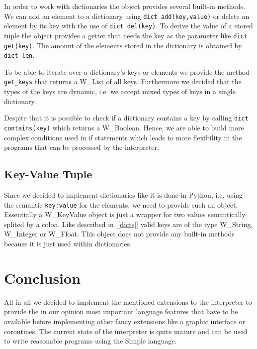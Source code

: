 \documentclass{article}
\begin{document}
In order to work with dictionaries the object provides several built-in methods.
We can add an element to a dictionary using \texttt{dict add(key,value)} or delete an element by its key with the use of \texttt{dict del(key)}.
To derive the value of a stored tuple the object provides a getter that needs the key as the parameter like \texttt{dict get(key)}.
The amount of the elements stored in the dictionary is obtained by \texttt{dict len}.

To be able to iterate over a dictionary's keys or elements we provide the method \texttt{get\_keys} that returns a W\_List of all keys.
Furthermore we decided that the types of the keys are dynamic, i.e. we accept mixed types of keys in a single dictionary.

Despite that it is possible to check if a dictionary contains a key by calling \texttt{dict contains(key)} which returns a W\_Boolean.
Hence, we are able to build more complex conditions used in if statements which leads to more flexibility in the programs that can be processed by the interpreter.

\subsection{Key-Value Tuple}
Since we decided to implement dictionaries like it is done in Python, i.e. using the semantic \texttt{key:value} for the elements, we need to provide such an object.
Essentially a W\_KeyValue object is just a wrapper for two values semantically splited by a colon.
Like described in [\ref{dicts}] valid keys are of the type W\_String, W\_Integer or W\_Float.
This object does not provide any built-in methods because it is just used within dictionaries.

\section{Conclusion}
All in all we decided to implement the mentioned extensions to the interpreter to provide the in our opinion most important language features that have to be available before implementing other fancy extensions like a graphic interface or coroutines.  
The current state of the interpreter is quite mature and can be used to write reasonable programs using the Simple language.

\newpage
\end{document}

